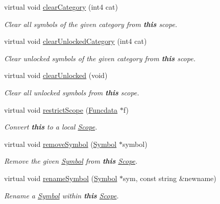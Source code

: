\begin{DoxyCompactItemize}
virtual void \mbox{\hyperlink{class_scope_ghidra_a7c52834934353c6d92f5ae459d08e2ad}{clear\+Category}} (int4 cat)
\begin{DoxyCompactList}\small\item\em Clear all symbols of the given category from {\bfseries{this}} scope. \end{DoxyCompactList}\item 
virtual void \mbox{\hyperlink{class_scope_ghidra_a1c8f2ce3c7783b86d375bc6d702c461c}{clear\+Unlocked\+Category}} (int4 cat)
\begin{DoxyCompactList}\small\item\em Clear unlocked symbols of the given category from {\bfseries{this}} scope. \end{DoxyCompactList}\item 
virtual void \mbox{\hyperlink{class_scope_ghidra_a32e0189b87b6c66641c7de9baf118457}{clear\+Unlocked}} (void)
\begin{DoxyCompactList}\small\item\em Clear all unlocked symbols from {\bfseries{this}} scope. \end{DoxyCompactList}\item 
virtual void \mbox{\hyperlink{class_scope_ghidra_a0de93cdd506ae1490d939b957738f656}{restrict\+Scope}} (\mbox{\hyperlink{class_funcdata}{Funcdata}} $\ast$f)
\begin{DoxyCompactList}\small\item\em Convert {\bfseries{this}} to a local \mbox{\hyperlink{class_scope}{Scope}}. \end{DoxyCompactList}\item 
virtual void \mbox{\hyperlink{class_scope_ghidra_af54aaf6bcabc70b6b705fd1b49ecd720}{remove\+Symbol}} (\mbox{\hyperlink{class_symbol}{Symbol}} $\ast$symbol)
\begin{DoxyCompactList}\small\item\em Remove the given \mbox{\hyperlink{class_symbol}{Symbol}} from {\bfseries{this}} \mbox{\hyperlink{class_scope}{Scope}}. \end{DoxyCompactList}\item 
virtual void \mbox{\hyperlink{class_scope_ghidra_af6476f25701e4bc419644bab003d5513}{rename\+Symbol}} (\mbox{\hyperlink{class_symbol}{Symbol}} $\ast$sym, const string \&newname)
\begin{DoxyCompactList}\small\item\em Rename a \mbox{\hyperlink{class_symbol}{Symbol}} within {\bfseries{this}} \mbox{\hyperlink{class_scope}{Scope}}. \end{DoxyCompactList}\item 

\end{DoxyCompactItemize}
